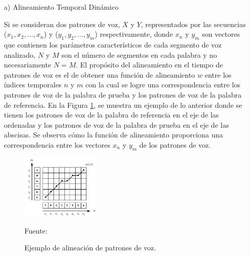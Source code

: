 \begin{enumerate}
\item[a)]Alineamiento Temporal Dinámico
\par
Si se consideran dos patrones de voz, $X$ y $Y$, representados por las secuencias ($x_{1}, x_{2},..., x_{n}$) y ($y_{1}, y_{2},..., y_{m}$) respectivamente, donde $x_{n}$ y $y_{m}$ son vectores que contienen los parámetros característicos de cada segmento de voz analizado, $N$ y $M$ son el número de segmentos en cada palabra y no necesariamente $N = M$. 
\vskip 0.3cm
El propósito del alineamiento en el tiempo de patrones de voz es el de obtener una función de alineamiento $w$ entre los índices temporales $n$ y $m$ con la cual se logre una correspondencia entre los patrones de voz de la palabra de prueba y los patrones de voz de la palabra de referencia. En la Figura \ref{fig:figura2.45}, se muestra un ejemplo de lo anterior donde se tienen los patrones de voz de la palabra de referencia en el eje de las ordenadas y los patrones de voz de la palabra de prueba en el eje de las abscisas. Se observa cómo la función de alineamiento proporciona una correspondencia entre los vectores $x_{n}$ y $y_{m}$ de los patrones de voz.
\begin{figure}[H]
\begin{center}
\includegraphics[width=0.35\textwidth]{Imagenes/Cap2/image046}
\end{center}
\begin{center}
\vskip -0.5cm
\caption{\small{Ejemplo de alineación de patrones de voz.}}
\label{fig:figura2.45}
{\small{Fuente: \cite{rabiner}}}
\end{center}
\end{figure}


\end{enumerate}
